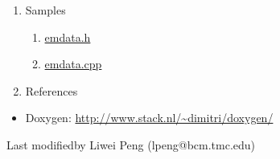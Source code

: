 \begin{enumerate}
\item Samples
\begin{enumerate}
\item \href{./html/emdata_8h-source.html}{emdata.h}
\item \href{./html/emdata_8cpp-source.html}{emdata.cpp}

\end{enumerate}

\item References

\end{enumerate}
\begin{itemize}
\item Doxygen: \url{http://www.stack.nl/~dimitri/doxygen/}


\end{itemize}





Last modifiedby Liwei Peng (lpeng@bcm.tmc.edu)\\ 
\\ 

%
